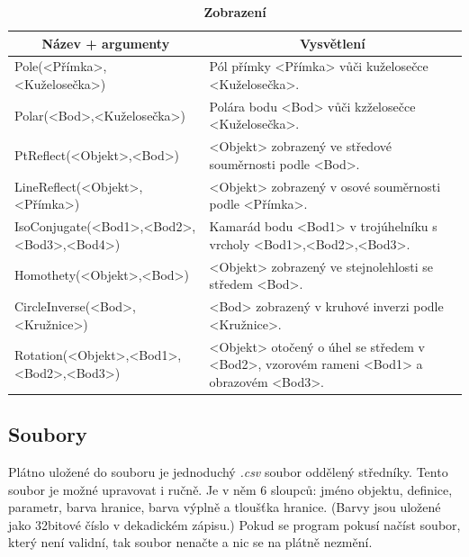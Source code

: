 \documentclass[11pt]{article}
\begin{document}
    \begin{table}[!htb]
    \begin{center}
        \caption{\bf Zobrazení}
        \begin{tabularx}{\linewidth}{|l|X|}
            \hline 
            \multicolumn{1}{|c|}{\textbf{Název + argumenty}} & \multicolumn{1}{c|}{\textbf{Vysvětlení}}\\
            \hline 
            
            Pole(<Přímka>,<Kuželosečka>) & Pól přímky <Přímka> vůči kuželosečce <Kuželosečka>. \\
            \hline
            Polar(<Bod>,<Kuželosečka>) & Polára bodu <Bod> vůči kzželosečce <Kuželosečka>. \\
            \hline
            PtReflect(<Objekt>,<Bod>) & <Objekt> zobrazený ve středové souměrnosti podle <Bod>. \\
            \hline
            LineReflect(<Objekt>,<Přímka>) & <Objekt> zobrazený v osové souměrnosti podle <Přímka>. \\
            \hline
            IsoConjugate(<Bod1>,<Bod2>,<Bod3>,<Bod4>) & Kamarád bodu <Bod1> v trojúhelníku s vrcholy <Bod1>,<Bod2>,<Bod3>. \\
            \hline
            Homothety(<Objekt>,<Bod>) & <Objekt> zobrazený ve stejnolehlosti se středem <Bod>. \\
            \hline
            CircleInverse(<Bod>,<Kružnice>) & <Bod> zobrazený v kruhové inverzi podle <Kružnice>. \\
            \hline
            Rotation(<Objekt>,<Bod1>,<Bod2>,<Bod3>) & <Objekt> otočený o úhel se středem v <Bod2>, vzorovém rameni <Bod1> a obrazovém <Bod3>. \\
            \hline
        \end{tabularx}
    \end{center}
    \end{table}

    \begin{samepage}
        \subsection{Soubory}
        Plátno uložené do souboru je jednoduchý \textit{.csv} soubor oddělený středníky. Tento soubor je možné upravovat i ručně. Je v něm 6 sloupců: jméno objektu, definice, parametr, barva hranice, barva výplně a tloušťka hranice. (Barvy jsou uložené jako 32bitové číslo v dekadickém zápisu.) Pokud se program pokusí načíst soubor, který není validní, tak soubor nenačte a nic se na plátně nezmění.
        
    \end{samepage}
\end{document}
